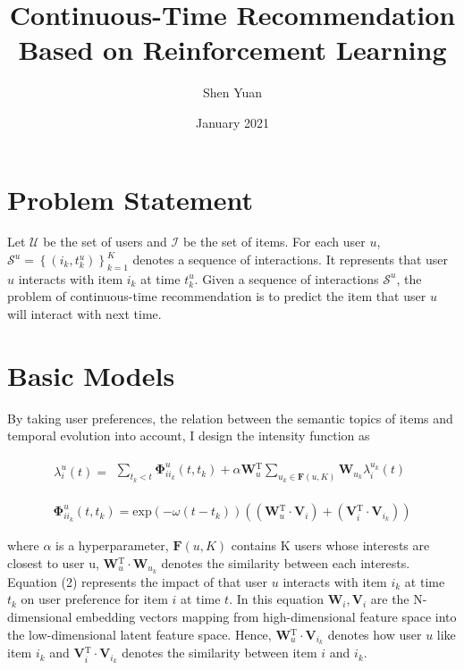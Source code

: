 \documentclass{article}
\title{Continuous-Time Recommendation Based on Reinforcement Learning}
\author{Shen Yuan}
\date{January 2021}
\begin{document}
\maketitle

\section{Problem Statement}
Let $\mathcal{U}$ be the set of users and $\mathcal{I}$ be the set of items. For each user $u$, $\mathcal{S}^u=\left\{(i_k, t_k^u)\right\}_{k=1}^{K}$ denotes a sequence of interactions. It represents that user $u$ interacts with item $i_k$ at time $t_k^u$. Given a sequence of interactions $\mathcal{S}^u$, the problem of continuous-time recommendation is to predict the item that user $u$ will interact with next time.

\section{Basic Models}
By taking user preferences, the relation between the semantic topics of items and temporal evolution into account, I design the intensity function as

\begin{align}
\lambda_i^u(t) = \begin{matrix} \sum_{t_k<t} \boldsymbol{\Phi}_{ii_k}^u(t, t_k)  + \alpha\boldsymbol{W}{_u^\mathrm{T}} \sum_{u_k \in \boldsymbol{F}(u, K)} \boldsymbol{W}{_{u_k}} \lambda_i^{u_k}(t) \end{matrix}
\end{align} 

\begin{align}
\boldsymbol{\Phi}_{ii_k}^u(t, t_k) = \mathrm{exp}(-\omega(t-t_k))  (( \boldsymbol{W}{_u^\mathrm{T}} \cdot \boldsymbol{V}{_{i}})+( \boldsymbol{V}{_i^\mathrm{T}} \cdot \boldsymbol{V}{_{i_k}}))
\end{align} 


where $\alpha$ is a hyperparameter, $\boldsymbol{F}(u, K)$ contains K users whose interests are closest to user u, $\boldsymbol{W}{_u^\mathrm{T}} \cdot \boldsymbol{W}{_{u_k}}$ denotes the similarity between each interests. Equation (2) represents the impact of that user $u$ interacts with item $i_k$ at time $t_k$ on user preference for item $i$ at time $t$. In this equation $\boldsymbol{W}_i, \boldsymbol{V}_i$ are the N-dimensional embedding vectors mapping from high-dimensional feature space into the low-dimensional latent feature space. Hence, $\boldsymbol{W}{_u^\mathrm{T}} \cdot \boldsymbol{V}{_{i_k}} $ denotes how user $u$ like item $i_k$ and $\boldsymbol{V}{_i^\mathrm{T}} \cdot \boldsymbol{V}{_{i_k}}$ denotes the similarity between item $i$ and $i_k$. 
\end{document}
